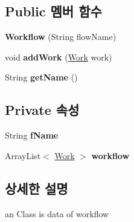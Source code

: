 \subsection*{Public 멤버 함수}
\begin{DoxyCompactItemize}
\item 
\hypertarget{classkookmin_1_1cs_1_1homeflow_1_1data_1_1_workflow_a12a9629721814a6d14c3fc4944576185}{}{\bfseries Workflow} (String flow\+Name)\label{classkookmin_1_1cs_1_1homeflow_1_1data_1_1_workflow_a12a9629721814a6d14c3fc4944576185}

\item 
\hypertarget{classkookmin_1_1cs_1_1homeflow_1_1data_1_1_workflow_a26090da91ab289560143a25063a9fd0e}{}void {\bfseries add\+Work} (\hyperlink{classkookmin_1_1cs_1_1homeflow_1_1data_1_1_workflow_1_1_work}{Work} work)\label{classkookmin_1_1cs_1_1homeflow_1_1data_1_1_workflow_a26090da91ab289560143a25063a9fd0e}

\item 
\hypertarget{classkookmin_1_1cs_1_1homeflow_1_1data_1_1_workflow_ae52da38b041aa0bb66ead165b6e88082}{}String {\bfseries get\+Name} ()\label{classkookmin_1_1cs_1_1homeflow_1_1data_1_1_workflow_ae52da38b041aa0bb66ead165b6e88082}

\end{DoxyCompactItemize}
\subsection*{Private 속성}
\begin{DoxyCompactItemize}
\item 
\hypertarget{classkookmin_1_1cs_1_1homeflow_1_1data_1_1_workflow_a73b794c2949c966cad5e34edb2249dbe}{}String {\bfseries f\+Name}\label{classkookmin_1_1cs_1_1homeflow_1_1data_1_1_workflow_a73b794c2949c966cad5e34edb2249dbe}

\item 
\hypertarget{classkookmin_1_1cs_1_1homeflow_1_1data_1_1_workflow_aa2201c9f62856d58e534199e244f1656}{}Array\+List$<$ \hyperlink{classkookmin_1_1cs_1_1homeflow_1_1data_1_1_workflow_1_1_work}{Work} $>$ {\bfseries workflow}\label{classkookmin_1_1cs_1_1homeflow_1_1data_1_1_workflow_aa2201c9f62856d58e534199e244f1656}

\end{DoxyCompactItemize}


\subsection{상세한 설명}
an Class is data of workflow 

